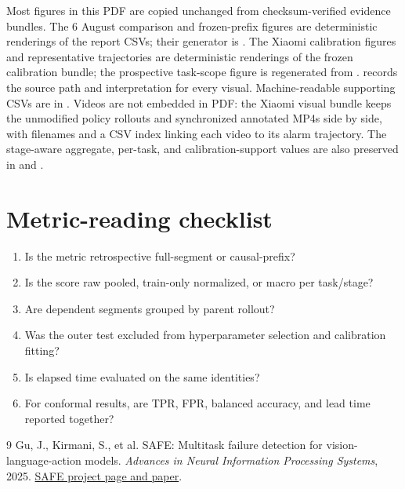 \documentclass[11pt,a4paper]{article}
\begin{document}
Most figures in this PDF are copied unchanged from checksum-verified evidence
bundles. The 6 August comparison and frozen-prefix figures are deterministic
renderings of the report CSVs; their generator is
. The Xiaomi calibration figures and
representative trajectories are deterministic renderings of the frozen
calibration bundle; the prospective task-scope figure is regenerated from
.
 records the source path and
interpretation for every visual. Machine-readable supporting CSVs are in
. Videos are not embedded in PDF: the Xiaomi visual bundle keeps
the unmodified policy rollouts and synchronized annotated MP4s side by side,
with filenames and a CSV index linking each video to its alarm trajectory.
The stage-aware aggregate, per-task, and calibration-support values are also
preserved in  and
.

\section{Metric-reading checklist}
\begin{enumerate}
\item Is the metric retrospective full-segment or causal-prefix?
\item Is the score raw pooled, train-only normalized, or macro per task/stage?
\item Are dependent segments grouped by parent rollout?
\item Was the outer test excluded from hyperparameter selection and calibration fitting?
\item Is elapsed time evaluated on the same identities?
\item For conformal results, are TPR, FPR, balanced accuracy, and lead time reported together?
\end{enumerate}

\begin{thebibliography}{9}
Gu, J., Kirmani, S., et al.
\newblock SAFE: Multitask failure detection for vision-language-action models.
\newblock \emph{Advances in Neural Information Processing Systems}, 2025.
\newblock \href{https://vla-safe.github.io/}{SAFE project page and paper}.
\end{thebibliography}
\end{document}
